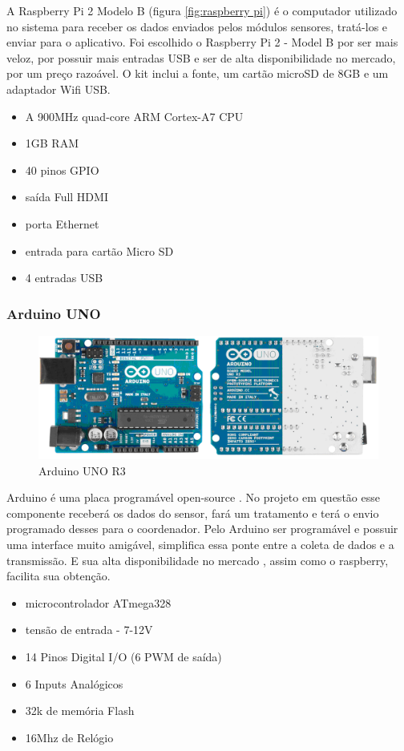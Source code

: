 A Raspberry Pi 2 Modelo B (figura \ref{fig:raspberry pi}) é o computador utilizado no sistema para receber os dados enviados pelos módulos sensores, tratá-los e enviar para o aplicativo. Foi escolhido o Raspberry Pi 2 - Model B por ser mais veloz, por possuir mais entradas USB e ser de alta disponibilidade no mercado, por um preço razoável. O kit inclui a fonte, um cartão microSD de 8GB e um adaptador Wifi USB.

\begin{itemize}
\item{A 900MHz quad-core ARM Cortex-A7 CPU}
\item{1GB RAM}
\item{40 pinos GPIO}
\item{saída Full HDMI}
\item{porta Ethernet}
\item{entrada para cartão Micro SD}
\item{4 entradas USB}
\end{itemize}
%
\subsubsection{Arduino UNO}
\begin{figure}[H]
\includegraphics[width=1\textwidth]{figuras/arduino_uno.png}
\caption{\label{fig:arduino uno} Arduino UNO R3}
\end{figure}

Arduino é uma placa programável open-source . No projeto em questão esse componente receberá os dados do sensor, fará um tratamento e terá o envio programado desses para o coordenador. Pelo Arduino ser programável e possuir uma interface muito amigável, simplifica essa ponte entre a coleta de dados e a transmissão. E sua alta disponibilidade no mercado , assim como o raspberry, facilita sua obtenção.

\begin{itemize}
\item{microcontrolador ATmega328}
\item{tensão de entrada - 7-12V}
\item{14 Pinos Digital I/O (6 PWM de saída)}
\item{6 Inputs Analógicos}
\item{32k de memória Flash}
\item{16Mhz de Relógio}
\end{itemize}
%
